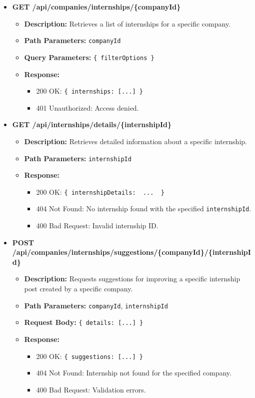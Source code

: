 \begin{itemize}
    \item \textbf{GET /api/companies/internships/\{companyId\}}  
    \begin{itemize}
        \item \textbf{Description:} Retrieves a list of internships for a specific company.
        \item \textbf{Path Parameters:} \texttt{companyId}
        \item \textbf{Query Parameters:} \texttt{\{ filterOptions \}}
        \item \textbf{Response:}
        \begin{itemize}
            \item 200 OK: \texttt{\{ internships: [...] \}}
            \item 401 Unauthorized: Access denied.
        \end{itemize}
    \end{itemize}

    \item \textbf{GET /api/internships/details/\{internshipId\}}  
    \begin{itemize}
        \item \textbf{Description:} Retrieves detailed information about a specific internship.
        \item \textbf{Path Parameters:} \texttt{internshipId}
        \item \textbf{Response:}
        \begin{itemize}
            \item 200 OK: \texttt{\{ internshipDetails: { ... } \}}
            \item 404 Not Found: No internship found with the specified \texttt{internshipId}.
            \item 400 Bad Request: Invalid internship ID.
        \end{itemize}
    \end{itemize}


    \item \textbf{POST /api/companies/internships/suggestions/\{companyId\}/\{internshipId\}} 
    \begin{itemize}
        \item \textbf{Description:} Requests suggestions for improving a specific internship post created by a specific company.
        \item \textbf{Path Parameters:} \texttt{companyId}, \texttt{internshipId}
        \item \textbf{Request Body:} \texttt{\{ details: [...] \}}
        \item \textbf{Response:}
        \begin{itemize}
            \item 200 OK: \texttt{\{ suggestions: [...] \}}
            \item 404 Not Found: Internship not found for the specified company.
            \item 400 Bad Request: Validation errors.
        \end{itemize}
    \end{itemize}



\end{itemize}
